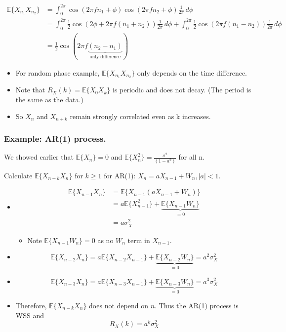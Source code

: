 \documentclass[12pt]{article}
\newcommand{\intpi}{\int_{0}^{2\pi}}
\newcommand{\sigd}{\sigma^2}
\newcommand{\mexpproc}[1]{\mathbb{E}\{ #1\}}
\begin{document}
\begin{align*}
    \mexpproc{X_{n_1}X_{n_2}} &= \intpi \cos(2\pi fn_1 + \phi)\cos(2\pi fn_2 + \phi) \frac{1}{2\pi}\, d\phi \\
    &= \intpi \frac{1}{2}\cos(2\phi + 2\pi f(n_1+n_2))\frac{1}{2\pi}\, d\phi + \intpi \frac{1}{2}\cos(2\pi f(n_1-n_2))\frac{1}{2\pi}\, d\phi\\
    &= \frac{1}{2}\cos(2\pi f \underbrace{(n_2 - n_1)}_{\textrm{only difference}})
\end{align*}
\begin{itemize}
    \item For random phase example, $\mexpproc{X_{n_1}X_{n_2}}$ only depends on the time difference.
    \item Note that $R_X(k) = \mexpproc{X_0X_k}$ is periodic and does not decay. (The period is the same as the data.)
    \item So $X_n$ and $X_{n+k}$ remain strongly correlated even as k increases.
\end{itemize}
\subsubsection{Example: AR(1) process.}

We showed earlier that $\mexpproc{X_n}=0$ and $\mexpproc{X_n^2} = \frac{\sigd}{(1-a^2)}$ for all n.

Calculate $\mexpproc{X_{n-k}X_n}$ for $k\ge 1$ for AR(1): $X_n = a X_{n-1} + W_n , |a|<1$.
\begin{itemize}
\item 
\begin{align*}
    \mexpproc{X_{n-1}X_n} &= \mexpproc{X_{n-1}(a X_{n-1}+W_n)}\\
    & = a \mexpproc{X^2_{n-1}} + \underbrace{\mexpproc{X_{n-1}W_{n}} }_{=0}\\
    & = a \sigd_X
\end{align*}
\begin{itemize}
    \item Note $\mexpproc{X_{n-1}W_{n}} =0$ as no $W_n$ term in $X_{n-1}$.
\end{itemize}
\item \[
\mexpproc{X_{n-2}X_n} = a\mexpproc{X_{n-2}X_{n-1}} + \underbrace{\mexpproc{X_{n-2}W_{n}} }_{=0} = a^2\sigd_X
\]
\item \[
\mexpproc{X_{n-3}X_n} = a\mexpproc{X_{n-3}X_{n-1}} + \underbrace{\mexpproc{X_{n-3}W_{n}} }_{=0} = a^3\sigd_X
\]
\item Therefore, $\mexpproc{X_{n-k}X_n}$ does not depend on $n$. Thus the AR(1) process is WSS and 
\[
R_X(k) = a^k \sigd_X
\]
\end{itemize}
\end{document}

